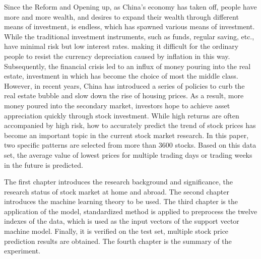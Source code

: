 \begin{enabstract}
    Since the Reform and Opening up, as China's economy has taken off,
    people have more and more wealth, and desires to expand their wealth
    through different means of investment, is endless, which has spawned
    various means of investment. While the traditional investment instruments,
    such as funds, regular saving, etc., have minimal risk but low interest rates.
    making it difficult for the ordinary people to resist the currency depreciation
    caused by inflation in this way. Subsequently, the financial crisis led to an
    influx of money pouring into the real estate, investment in which
    has become the choice of most the middle class. However, in recent years,
    China has introduced a series of policies to curb the real estate
    bubble and slow down the rise of housing prices. As a result, more money
    poured into the secondary market, investors hope to achieve asset
    appreciation quickly through stock investment. While high returns are
    often accompanied by high risk, how to accurately predict the trend
    of stock prices has become an important topic in the current stock market
    research. In this paper, two specific patterns are selected from more
    than 3600 stocks. Based on this data set, the average value of lowest
    prices for multiple trading days or trading weeks in the future is predicted.

    The first chapter introduces the research background and significance,
    the research status of stock market at home and abroad. The second chapter
    introduces the machine learning theory to be used. The third chapter is the
    application of the model, standardized method is applied to preprocess
    the twelve indexes of the data, which is used as the input vectors of the support
    vector machine model. Finally, it is verified on the test set, multiple
    stock price prediction results are obtained. The fourth chapter is the summary 
    of the experiment.

\end{enabstract}
